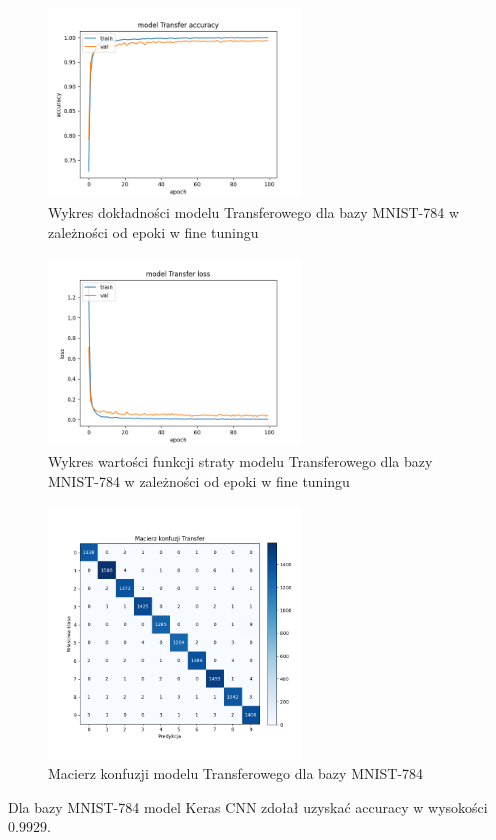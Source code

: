 \documentclass{article}
\begin{document}
\begin{figure}[H]
    \centering
    \includegraphics[width=0.6\textwidth]{../Saves/Transfer/mnist-784/Transfer_mnist_784_ep100_acc.png}
    \caption{Wykres dokładności modelu Transferowego dla bazy MNIST-784 w zależności od epoki w fine tuningu}
\end{figure}

\begin{figure}[H]
    \centering
    \includegraphics[width=0.6\textwidth]{../Saves/Transfer/mnist-784/Transfer_mnist_784_ep100_loss.png}
    \caption{Wykres wartości funkcji straty modelu Transferowego dla bazy MNIST-784 w zależności od epoki w fine tuningu} 
\end{figure}

\begin{figure}[H]
	\centering
	\includegraphics[width=0.6\textwidth]{../Saves/Transfer/mnist-784/Transfer_mnist_784_conf_mat.png}
	\caption{Macierz konfuzji modelu Transferowego dla bazy MNIST-784}
\end{figure}
Dla bazy MNIST-784 model Keras CNN zdołał uzyskać accuracy w wysokości $0.9929$.
\end{document}
